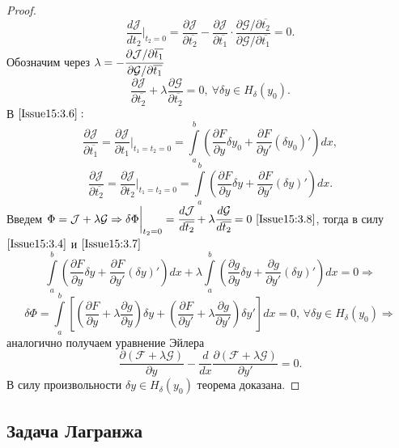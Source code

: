\begin{proof}
\[ 
    \frac{d\mathcal{J}}{d t_2} \bigg|_{t_2=0} = \frac{\partial \mathcal{J}}{\partial \overline{t_2}} - \frac{\partial \mathcal{J}}{\partial \overline{t_1}}\cdot \frac{ \partial \mathcal{G}/\partial \overline{t_2}}{\partial \mathcal{G}/\partial \overline{t_1}}=0.
\]
Обозначим через $\lambda = -\cfrac{\partial\mathcal{J}/\partial \overline{t_1}}{\partial\mathcal{G} / \partial \overline{t_1}}$
\begin{equation}
\label{Issue15:3.8}
\frac{\partial\mathcal{J}}{\partial\overline{t_2}}+\lambda \frac{\partial\mathcal{G}}{\partial\overline{t_2}}=0, ~\forall\delta y \in H_\delta(y_0). 
\end{equation}
В $\eqref{Issue15:3.6}:$
\begin{equation}
    \label{Issue15:3.7}
    \frac{\partial\mathcal{J}}{\partial \overline{t_1}}=\frac{\partial \mathcal{J}}{\partial t_1}\bigg|_{t_1=t_2=0}=\int\limits_a^b \left( \frac{\partial F}{\partial y}\delta y_0 + \frac{\partial F}{\partial y'}(\delta y_0)' \right) dx,
    \end{equation}
    \begin{equation*}
    \frac{\partial\mathcal{J}}{\partial \overline{t_2}}=\frac{\partial \mathcal{J}}{\partial t_2}\bigg|_{t_1=t_2=0}=\int\limits_a^b \left( \frac{\partial F}{\partial y}\delta y+\frac{\partial F}{\partial y'}(\delta y)' \right) dx.
\end{equation*}
Введем $\Phi = \mathcal{J}+\lambda\mathcal{G}\Rightarrow \delta \Phi\bigg|_{t_2=0}=\cfrac{d\mathcal{J}}{d\overline{t_2}}+\lambda\cfrac{d\mathcal{G}}{d\overline{t_2}}=0 ~\eqref{Issue15:3.8}$, тогда в силу $\eqref{Issue15:3.4}$ и $\eqref{Issue15:3.7}$ $$\int\limits_a^b\left(\frac{\partial F}{\partial y}\delta y + \frac{\partial F}{\partial y'}(\delta y)'\right)d x+\lambda\int\limits_a^b\left(\frac{\partial g}{\partial y}\delta y + \frac{\partial g}{\partial y'}(\delta y)'\right)d x=0\Rightarrow$$$$ 
\delta \Phi =\int\limits_a^b\left[\left(\frac{\partial F}{\partial y}+ \lambda\frac{\partial g}{\partial y}\right)\delta y + \left(\frac{\partial F}{\partial y'}+ \lambda\frac{\partial g}{\partial y'}\right)\delta y'\right]dx = 0, \, \forall \delta y \in H_\delta(y_0)\Rightarrow$$
аналогично получаем уравнение Эйлера
$$\frac{\partial(\mathcal{F}+\lambda\mathcal{G})}{\partial y}-\frac{d}{dx}\frac{\partial(\mathcal{F}+\lambda\mathcal{G})}{\partial y'}=0.$$
В силу произвольности $\delta y\in H_\delta(y_0)$ теорема доказана.
\end{proof}

\subsection{Задача Лагранжа}\par

